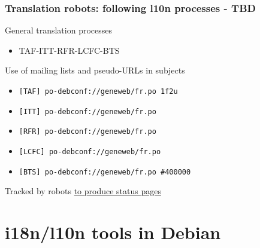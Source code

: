 \documentclass{beamer}
\begin{document}
\begin{frame}
  \frametitle{Translation robots: following l10n processes - TBD}
	\begin{block}
		{General translation processes}
		\begin{itemize}
		\item
			{TAF-ITT-RFR-LCFC-BTS}
		\end{itemize}
	\end{block}
	\begin{block}
		{Use of mailing lists and pseudo-URLs in subjects}
		\begin{itemize}
		\item
			{\texttt{[TAF] po-debconf://geneweb/fr.po 1f2u}}
		\item
			{\texttt{[ITT] po-debconf://geneweb/fr.po}}
		\item
			{\texttt{[RFR] po-debconf://geneweb/fr.po}}
		\item
			{\texttt{[LCFC] po-debconf://geneweb/fr.po}}
		\item
			{\texttt{[BTS] po-debconf://geneweb/fr.po \#400000}}
		\end{itemize}
	\end{block}
	\begin{block}
		{Tracked by robots \href{http://dutch.debian.net}{to produce status pages}}
	\end{block}
\end{frame}


\section{i18n/l10n tools in Debian}

\end{document}
